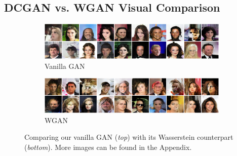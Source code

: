 \documentclass[table]{article}
\begin{document}
\subsection{DCGAN vs. WGAN Visual Comparison}
\begin{figure}[ht]
  \centering
  \begin{subfigure}{\textwidth}
    \centering
    \includegraphics[scale=0.5]{imgs/gan_examples}
    \caption{Vanilla GAN}
  \end{subfigure}

  \vspace*{3mm}
  \begin{subfigure}{\textwidth}
    \centering
    \includegraphics[scale=0.5]{imgs/wgan_examples}
    \caption{WGAN}
  \end{subfigure}
  \caption{Comparing our vanilla GAN (\textit{top}) with its Wasserstein counterpart (\textit{bottom}). More images can be found in the Appendix.}
    \label{compare}
\end{figure}

\end{document}
